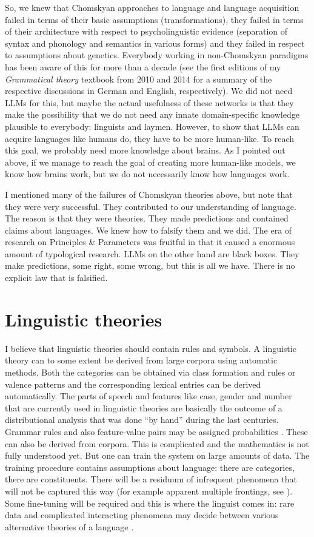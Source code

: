 So, we knew that Chomskyan approaches to language and language acquisition failed in terms of their
basic assumptions (transformations), they failed in terms of their architecture with respect to
psycholinguistic evidence (separation of syntax and phonology and semantics in various forms) and
they failed in respect to assumptions about genetics. Everybody working in non-Chomskyan paradigms
has been aware of this for more than a decade (see the first editions of my \emph{Grammatical theory} textbook
from 2010 and 2014 for a summary of the
respective discussions in German and English, respectively). We did not need LLMs for this, but maybe the actual usefulness of these networks is that
they make the possibility that we do not need any innate domain-specific knowledge plausible to
everybody: linguists and laymen. However, to show that LLMs can acquire languages like humans do, they have
to be more human-like. To reach this goal, we probably need more knowledge about brains. As I
pointed out above, if we manage to reach the goal of creating more human-like models, we know how
brains work, but we do not necessarily know how languages work.

I mentioned many of the failures of Chomskyan theories above, but note that they were very
successful. They contributed to our understanding of language. The reason is that they were
theories. They made predictions and contained claims about languages. We knew how to falsify them
and we did. The era of research on Principles \& Parameters was fruitful in that it caused a
enormous amount of typological research. LLMs on the other hand are black boxes. They make
predictions, some right, some wrong, but this is all we have. There is no explicit law that is falsified.

\section{Linguistic theories}

I believe that linguistic theories should contain rules and symbols. A linguistic theory can to some
extent be derived from large corpora using automatic methods. Both the categories can be obtained
via class formation and rules or valence patterns and the corresponding lexical entries can be
derived automatically. The parts of speech and features like case, gender and
number that are currently used in linguistic theories are basically the outcome of a distributional
analysis that was done ``by hand'' during the last centuries. Grammar rules and also feature-value
pairs may be assigned probabilities \citep{Jurafsky96a}. These can also be derived from corpora. This is complicated and
the mathematics is not fully understood yet. But one can train the system on large amounts of
data. The training procedure contains assumptions about language: there are categories, there are
constituents. There will be a residuum of infrequent phenomena that will not be captured
this way (for example apparent multiple frontings, see \citealt{Mueller2003b}). Some fine-tuning will be
required and this is where the linguist comes in: rare data and complicated interacting phenomena may decide between various alternative
theories of a language \citep[Chapter~6]{MuellerGS}. 

